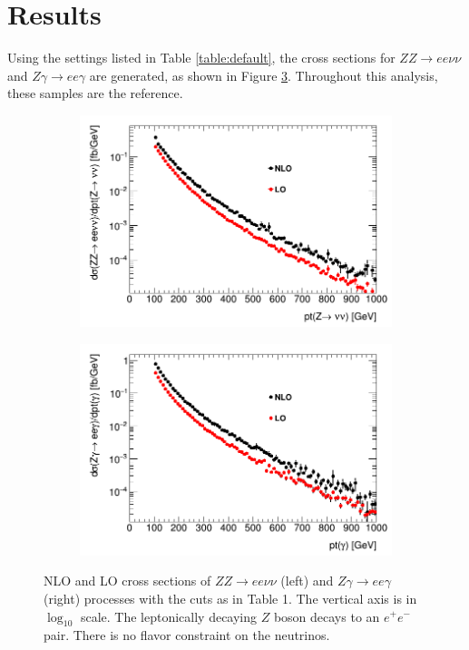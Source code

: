 \documentclass[11pt,a4paper]{report}
\begin{document}
\section{Results}
Using the settings listed in Table \ref{table:default}, the cross sections for $ZZ\to ee\nu\nu$ and $Z\gamma\to ee\gamma$ are generated, as shown in Figure \ref{xsecs}. Throughout this analysis, these samples are the reference.
\begin{figure}[H]
\centering
	\begin{subfigure}{0.49\textwidth}
		\includegraphics[width=\linewidth]{ZZ_xsec.png}
		\caption{}
		\label{subfig:ZeeZvv}
	\end{subfigure}	
	\begin{subfigure}{0.49\textwidth}
		\includegraphics[width=\linewidth]{Zg_xsec.png}
		\caption{}
		\label{subfig:Zeeg}	
	\end{subfigure}
	\caption{NLO and LO cross sections of $ZZ\to ee\nu\nu$ (left) and $Z\gamma\to ee\gamma$ (right) processes with the cuts as in Table 1. The vertical axis is in $\log_{10}$ scale. The leptonically decaying $Z$ boson decays to an $e^+e^-$ pair. There is no flavor constraint on the neutrinos.}
	\label{xsecs}
\end{figure}
\end{document}
